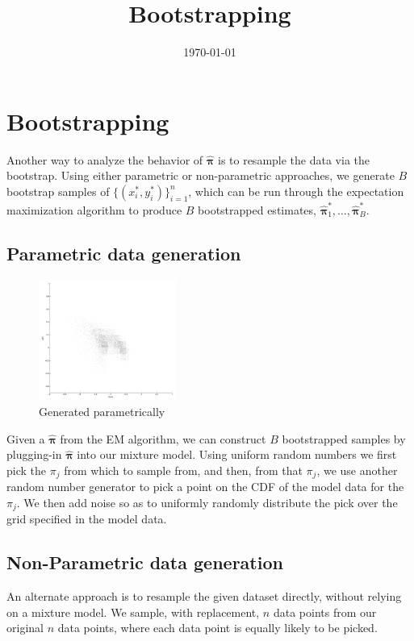 \documentclass[12pt]{amsart}
\title{Bootstrapping}
\author{\today}
\newcommand{\vect}[1]{\boldsymbol{\mathbf{#1}}}
\newcommand{\bl}{\big\{}
\newcommand{\br}{\big\}}
\newcommand{\vph}{\hat{\vect{\pi}}}
\begin{document}
\maketitle

\section{Bootstrapping}
Another way to analyze the behavior of $\vph$ is to resample the data via the bootstrap. Using either parametric or non-parametric approaches, we generate $B$ bootstrap samples of $\bl (x^*_i,y^*_i) \br^n_{i=1}$, which can be run through the expectation maximization algorithm to produce $B$ bootstrapped estimates, $\vph^*_1,\ldots,\vph^*_B$.

\subsection{Parametric data generation}
\begin{figure}
  \begin{center}
    \includegraphics[width=0.4\textwidth]{boot_gen_data.pdf}
  \end{center}
  \caption{Generated parametrically}
\end{figure}

Given a $\vph$ from the EM algorithm, we can construct $B$ bootstrapped samples by plugging-in $\vph$ into our mixture model. Using uniform random numbers we first pick the $\pi_j$ from which to sample from, and then, from that $\pi_j$, we use another random number generator to pick a point on the CDF of the model data for the $\pi_j$. We then add noise so as to uniformly randomly distribute the pick over the grid specified in the model data.




\subsection{Non-Parametric data generation}
An alternate approach is to resample the given dataset directly, without relying on a mixture model. We sample, with replacement, $n$ data points from our original $n$ data points, where each data point is equally likely to be picked.
\end{document}
